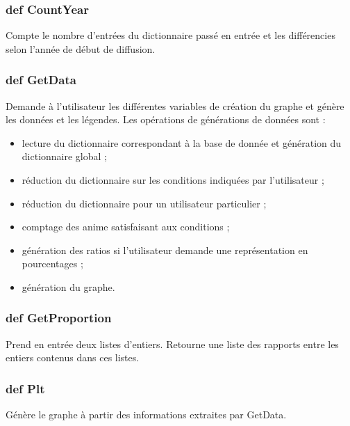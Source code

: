 \documentclass[a4paper,12pt]{article}
\begin{document}
\subsubsection{def CountYear}
Compte le nombre d'entrées du dictionnaire passé en entrée et les différencies selon l'année de début de diffusion.
\subsubsection{def GetData}
Demande à l'utilisateur les différentes variables de création du graphe et génère les données et les légendes. Les opérations de générations de données sont :
\begin{itemize}
\item lecture du dictionnaire correspondant à la base de donnée et génération du dictionnaire global ;
\item réduction du dictionnaire sur les conditions indiquées par l'utilisateur ;
\item réduction du dictionnaire pour un utilisateur particulier ;
\item comptage des anime satisfaisant aux conditions ;
\item génération des ratios si l'utilisateur demande une représentation en pourcentages ;
\item génération du graphe. 
\end{itemize}
\subsubsection{def GetProportion}
Prend en entrée deux listes d'entiers. Retourne une liste des rapports entre les entiers contenus dans ces listes.
\subsubsection{def Plt}
Génère le graphe à partir des informations extraites par GetData.
\end{document}
